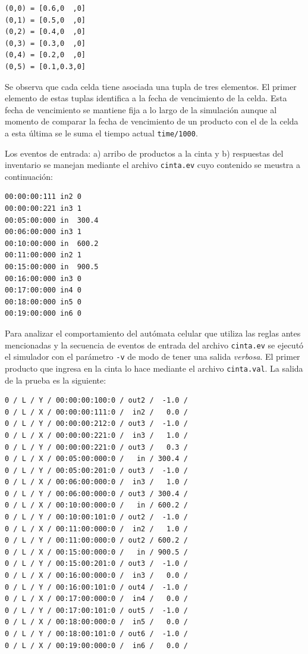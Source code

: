 \documentclass[10pt]{article}
\begin{document}
\begin{minipage}{1\textwidth}
	\centering
	\begin{lstlisting}
(0,0) = [0.6,0  ,0]
(0,1) = [0.5,0  ,0]
(0,2) = [0.4,0  ,0]
(0,3) = [0.3,0  ,0]
(0,4) = [0.2,0  ,0]
(0,5) = [0.1,0.3,0]
	\end{lstlisting}
\end{minipage}

Se observa que cada celda tiene asociada una tupla de tres elementos. El primer elemento de estas tuplas identifica a la fecha de vencimiento de la celda. Esta fecha de vencimiento se mantiene fija a lo largo de la simulación aunque al momento de comparar la fecha de vencimiento de un producto con el de la celda a esta última se le suma el tiempo actual \texttt{time/1000}.

Los eventos de entrada: a) arribo de productos a la cinta y b) respuestas del inventario se manejan mediante el archivo \texttt{cinta.ev} cuyo contenido se meustra a continuación:

\begin{minipage}{1\textwidth}
	\centering
	\begin{lstlisting}
00:00:00:111 in2 0
00:00:00:221 in3 1
00:05:00:000 in  300.4
00:06:00:000 in3 1
00:10:00:000 in  600.2
00:11:00:000 in2 1
00:15:00:000 in  900.5
00:16:00:000 in3 0
00:17:00:000 in4 0
00:18:00:000 in5 0
00:19:00:000 in6 0
	\end{lstlisting}	
\end{minipage}

Para analizar el comportamiento del autómata celular que utiliza las reglas antes mencionadas y la secuencia de eventos de entrada del archivo \texttt{cinta.ev} se ejecutó el simulador con el parámetro \texttt{-v} de modo de tener una salida \textit{verbosa}. El primer producto que ingresa en la cinta lo hace mediante el archivo \texttt{cinta.val}. La salida de la prueba es la siguiente:

\begin{minipage}{1\textwidth}
	\centering
	\begin{lstlisting}
0 / L / Y / 00:00:00:100:0 / out2 /  -1.0 /
0 / L / X / 00:00:00:111:0 /  in2 /   0.0 /
0 / L / Y / 00:00:00:212:0 / out3 /  -1.0 /
0 / L / X / 00:00:00:221:0 /  in3 /   1.0 /
0 / L / Y / 00:00:00:221:0 / out3 /   0.3 /
0 / L / X / 00:05:00:000:0 /   in / 300.4 /
0 / L / Y / 00:05:00:201:0 / out3 /  -1.0 /
0 / L / X / 00:06:00:000:0 /  in3 /   1.0 /
0 / L / Y / 00:06:00:000:0 / out3 / 300.4 /
0 / L / X / 00:10:00:000:0 /   in / 600.2 /
0 / L / Y / 00:10:00:101:0 / out2 /  -1.0 /
0 / L / X / 00:11:00:000:0 /  in2 /   1.0 /
0 / L / Y / 00:11:00:000:0 / out2 / 600.2 /
0 / L / X / 00:15:00:000:0 /   in / 900.5 /
0 / L / Y / 00:15:00:201:0 / out3 /  -1.0 /
0 / L / X / 00:16:00:000:0 /  in3 /   0.0 /
0 / L / Y / 00:16:00:101:0 / out4 /  -1.0 /
0 / L / X / 00:17:00:000:0 /  in4 /   0.0 /
0 / L / Y / 00:17:00:101:0 / out5 /  -1.0 /
0 / L / X / 00:18:00:000:0 /  in5 /   0.0 /
0 / L / Y / 00:18:00:101:0 / out6 /  -1.0 /
0 / L / X / 00:19:00:000:0 /  in6 /   0.0 /
	\end{lstlisting}	
\end{minipage}
\end{document}
